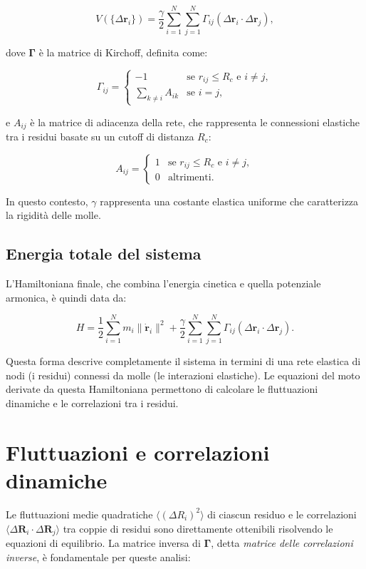 \documentclass[Lau,binding=0.6cm,oneside,noexaminfo]{sapthesis}
\begin{document}
\begin{equation}
V(\{\Delta \mathbf{r}_i\}) = \frac{\gamma}{2} \sum_{i=1}^N \sum_{j=1}^N \Gamma_{ij} (\Delta \mathbf{r}_i \cdot \Delta \mathbf{r}_j),
\end{equation}

dove $\mathbf{\Gamma}$ è la matrice di Kirchoff, definita come:

\begin{equation}
\Gamma_{ij} =
\begin{cases}
-1 & \text{se } r_{ij} \leq R_c \text{ e } i \neq j, \\
\sum_{k \neq i} A_{ik} & \text{se } i = j,
\end{cases}
\end{equation}

e $A_{ij}$ è la matrice di adiacenza della rete, che rappresenta le connessioni elastiche tra i residui basate su un cutoff di distanza $R_c$:

\begin{equation}
A_{ij} =
\begin{cases}
1 & \text{se } r_{ij} \leq R_c \text{ e } i \neq j, \\
0 & \text{altrimenti.}
\end{cases}
\end{equation}

In questo contesto, $\gamma$ rappresenta una costante elastica uniforme che caratterizza la rigidità delle molle.

\subsection*{Energia totale del sistema}
L'Hamiltoniana finale, che combina l'energia cinetica e quella potenziale armonica, è quindi data da:

\begin{equation}
H = \frac{1}{2} \sum_{i=1}^N m_i \|\dot{\mathbf{r}}_i\|^2 + \frac{\gamma}{2} \sum_{i=1}^N \sum_{j=1}^N \Gamma_{ij} (\Delta \mathbf{r}_i \cdot \Delta \mathbf{r}_j).
\end{equation}

Questa forma descrive completamente il sistema in termini di una rete elastica di nodi (i residui) connessi da molle (le interazioni elastiche). Le equazioni del moto derivate da questa Hamiltoniana permettono di calcolare le fluttuazioni dinamiche e le correlazioni tra i residui.

\section{Fluttuazioni e correlazioni dinamiche}
Le fluttuazioni medie quadratiche $\langle (\Delta R_i)^2 \rangle$ di ciascun residuo e le correlazioni $\langle \Delta \mathbf{R}_i \cdot \Delta \mathbf{R}_j \rangle$ tra coppie di residui sono direttamente ottenibili risolvendo le equazioni di equilibrio. La matrice inversa di $\mathbf{\Gamma}$, detta \textit{matrice delle correlazioni inverse}, è fondamentale per queste analisi:
\end{document}
